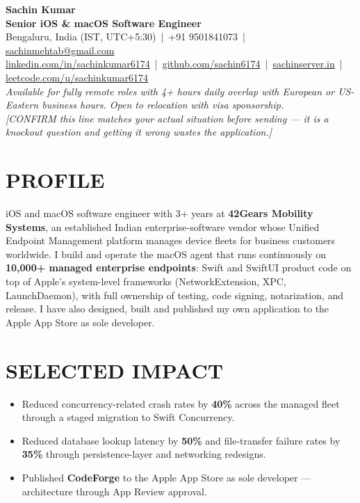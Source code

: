 \documentclass[letterpaper,11pt]{article}
\newcommand{\resumeItem}[1]{\item\small{{#1 \vspace{-2pt}}}}
\newcommand{\resumeItemListStart}{\begin{itemize}}
\newcommand{\resumeItemListEnd}{\end{itemize}\vspace{-5pt}}
\begin{document}
\begin{center}
{\Huge \textbf{Sachin Kumar}} \\ \vspace{4pt}
{\large \textbf{Senior iOS \& macOS Software Engineer}} \\ \vspace{5pt}
\small
Bengaluru, India (IST, UTC+5:30) \,|\, +91 9501841073 \,|\,
\href{mailto:sachinmehtab@gmail.com}{sachinmehtab@gmail.com} \\ \vspace{2pt}
\href{https://linkedin.com/in/sachinkumar6174}{linkedin.com/in/sachinkumar6174} \,|\,
\href{https://github.com/sachin6174}{github.com/sachin6174} \,|\,
\href{https://www.sachinserver.in}{sachinserver.in} \,|\,
\href{https://leetcode.com/u/sachinkumar6174/}{leetcode.com/u/sachinkumar6174} \\ \vspace{3pt}
\textit{Available for fully remote roles with 4+ hours daily overlap with European or US-Eastern business hours. Open to relocation with visa sponsorship.}
\\ \textit{\footnotesize [CONFIRM this line matches your actual situation before sending — it is a knockout question and getting it wrong wastes the application.]}
\end{center}

\vspace{-4pt}

\section{PROFILE}
\vspace{2pt}
\small iOS and macOS software engineer with 3+ years at \textbf{42Gears Mobility Systems}, an established Indian enterprise-software vendor whose Unified Endpoint Management platform manages device fleets for business customers worldwide. I build and operate the macOS agent that runs continuously on \textbf{10,000+ managed enterprise endpoints}: Swift and SwiftUI product code on top of Apple's system-level frameworks (NetworkExtension, XPC, LaunchDaemon), with full ownership of testing, code signing, notarization, and release. I have also designed, built and published my own application to the Apple App Store as sole developer.

\vspace{-2pt}

\section{SELECTED IMPACT}
    \vspace{2pt}
    \resumeItemListStart
        \resumeItem{Reduced concurrency-related crash rates by \textbf{40\%} across the managed fleet through a staged migration to Swift Concurrency.}
        \resumeItem{Reduced database lookup latency by \textbf{50\%} and file-transfer failure rates by \textbf{35\%} through persistence-layer and networking redesigns.}
        \resumeItem{Published \textbf{CodeForge} to the Apple App Store as sole developer — architecture through App Review approval.}
    \resumeItemListEnd
\end{document}
